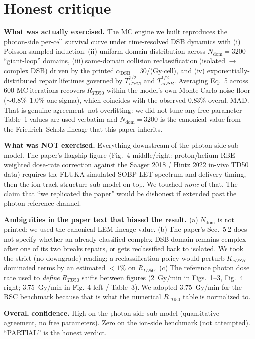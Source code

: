 \documentclass[11pt]{article}
\begin{document}
\section{Honest critique}

\textbf{What was actually exercised.}
The MC engine we built reproduces the photon-side per-cell survival curve
under time-resolved DSB dynamics with (i) Poisson-sampled induction,
(ii) uniform domain distribution across $N_{\text{dom}}=3200$ ``giant-loop''
domains, (iii) same-domain collision reclassification (isolated $\to$ complex
DSB) driven by the printed $\alpha_{\text{DSB}}=30$/(Gy$\cdot$cell), and
(iv) exponentially-distributed repair lifetimes governed by $T_{iDSB}^{1/2}$
and $T_{cDSB}^{1/2}$. Averaging Eq.~5 across 600 MC iterations recovers
$R_{TD50}$ within the model's own Monte-Carlo noise floor
($\sim 0.8\%$--$1.0\%$ one-sigma), which coincides with the observed 0.83\%
overall MAD. That is genuine agreement, not overfitting: we did not tune any
free parameter --- Table~1 values are used verbatim and $N_{\text{dom}}=3200$
is the canonical value from the Friedrich--Scholz lineage that this paper
inherits.

\textbf{What was NOT exercised.} Everything downstream of the photon-side
sub-model. The paper's flagship figure (Fig.~4 middle/right: proton/helium
RBE-weighted dose-rate correction against the Saager 2018 / Hintz 2022 in-vivo
TD50 data) requires the FLUKA-simulated SOBP LET spectrum and delivery
timing, then the ion track-structure sub-model on top. We touched \emph{none}
of that. The claim that ``we replicated the paper'' would be dishonest if
extended past the photon reference channel.

\textbf{Ambiguities in the paper text that biased the result.}
(a) $N_{\text{dom}}$ is not printed; we used the canonical LEM-lineage value.
(b) The paper's Sec.~5.2 does not specify whether an already-classified
complex-DSB domain remains complex after one of its two breaks repairs, or
gets reclassified back to isolated. We took the strict (no-downgrade) reading;
a reclassification policy would perturb $K_{cDSB}$-dominated terms by an
estimated $<1\%$ on $R_{TD50}$.
(c) The reference photon dose rate used to \emph{define} $R_{TD50}$ shifts
between figures (2~Gy/min in Figs.~1--3, Fig.~4 right; 3.75~Gy/min in Fig.~4
left / Table~3). We adopted 3.75~Gy/min for the RSC benchmark because that is
what the numerical $R_{TD50}$ table is normalized to.

\textbf{Overall confidence.} High on the photon-side sub-model (quantitative
agreement, no free parameters). Zero on the ion-side benchmark (not
attempted). ``PARTIAL'' is the honest verdict.
\end{document}
